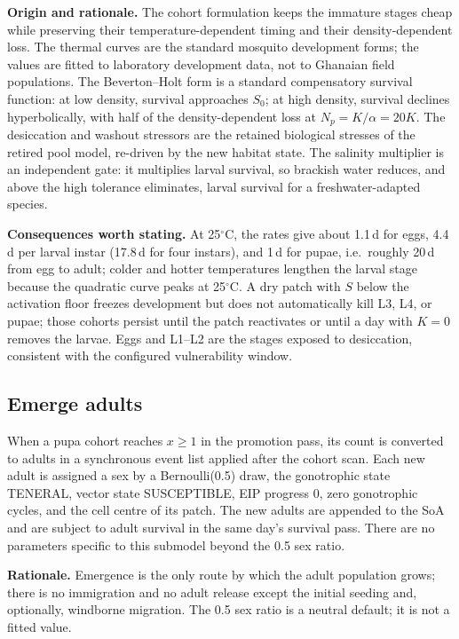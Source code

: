 \documentclass[11pt,a4paper]{article}
\begin{document}
\textbf{Origin and rationale.} The cohort formulation keeps the immature
stages cheap while preserving their temperature-dependent timing and
their density-dependent loss. The thermal curves are the standard
mosquito development forms; the values are fitted to laboratory
development data, not to Ghanaian field populations. The Beverton--Holt
form is a standard compensatory survival function: at low density,
survival approaches $S_0$; at high density, survival declines
hyperbolically, with half of the density-dependent loss at
$N_p=K/\alpha=20K$. The desiccation and washout stressors are the
retained biological stresses of the retired pool model, re-driven by the
new habitat state. The salinity multiplier is an independent gate: it
multiplies larval survival, so brackish water reduces, and above the
high tolerance eliminates, larval survival for a freshwater-adapted
species.

\textbf{Consequences worth stating.} At 25$^\circ$C, the rates give
about 1.1\,d for eggs, 4.4\,d per larval instar (17.8\,d for four
instars), and 1\,d for pupae, i.e.\ roughly 20\,d from egg to adult;
colder and hotter temperatures lengthen the larval stage because the
quadratic curve peaks at 25$^\circ$C. A dry patch with $S$ below the
activation floor freezes development but does not automatically kill
L3, L4, or pupae; those cohorts persist until the patch reactivates or
until a day with $K=0$ removes the larvae. Eggs and L1--L2 are the
stages exposed to desiccation, consistent with the configured
vulnerability window.

\subsection{Emerge adults}

When a pupa cohort reaches $x\ge1$ in the promotion pass, its count is
converted to adults in a synchronous event list applied after the cohort
scan. Each new adult is assigned a sex by a Bernoulli(0.5) draw, the
gonotrophic state TENERAL, vector state SUSCEPTIBLE, EIP progress 0, zero
gonotrophic cycles, and the cell centre of its patch. The new adults are
appended to the SoA and are subject to adult survival in the same day's
survival pass. There are no parameters specific to this submodel beyond
the 0.5 sex ratio.

\textbf{Rationale.} Emergence is the only route by which the adult
population grows; there is no immigration and no adult release except
the initial seeding and, optionally, windborne migration. The 0.5 sex
ratio is a neutral default; it is not a fitted value.
\end{document}
